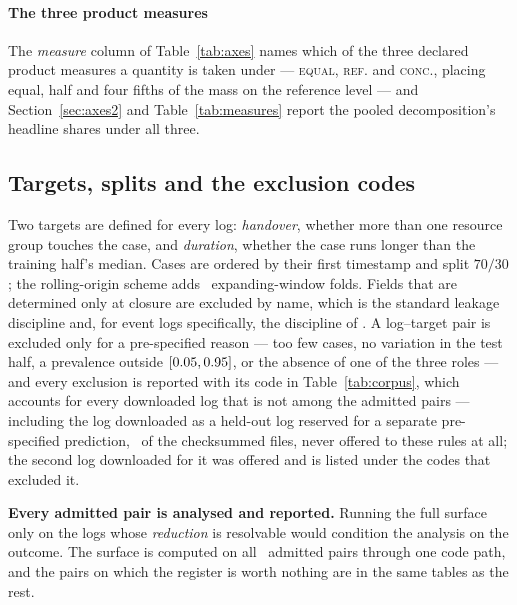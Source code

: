 \paragraph{The three product measures}
The \emph{measure} column of Table~\ref{tab:axes} names which of the three
declared product measures a quantity is taken under --- \textsc{equal},
\textsc{ref.} and \textsc{conc.}, placing equal, half and four fifths of the
mass on the reference level --- and Section~\ref{sec:axes2} and
Table~\ref{tab:measures} report the pooled decomposition's headline shares
under all three.

\subsection{Targets, splits and the exclusion codes}
\label{app:targets}


Two targets are defined for every log: \emph{handover}, whether more than one
resource group touches the case, and \emph{duration}, whether the case runs
longer than the training half's median. Cases are ordered by their first
timestamp and split $70/30$; the rolling-origin scheme adds \nFolds\
expanding-window folds. Fields that are determined only at closure are excluded by name, which is the
standard leakage discipline \citep{kaufman2012leakage,kapoor2023leakage} and,
for event logs specifically, the discipline of
\citet{weytjens2022leakage}. A log--target pair is excluded only for a
pre-specified reason --- too few cases, no variation in the test half, a prevalence outside
$[0.05, 0.95]$, or the absence of one of the three roles --- and every
exclusion is reported with its code in Table~\ref{tab:corpus}, which accounts
for every downloaded log that is not among the admitted pairs --- including
the log downloaded as a held-out log reserved for a separate pre-specified
prediction, \nHeldOutLogs\ of the checksummed files, never offered to these rules
at all; the second log downloaded for it was offered and is listed under the
codes that excluded it.


\textbf{Every admitted pair is analysed and reported.} Running the full
surface only on the logs whose \emph{reduction} is resolvable would condition
the analysis on the outcome. The surface is computed on all \nPairs\ admitted
pairs through one code path, and the pairs on which the register is worth
nothing are in the same tables as the rest.

